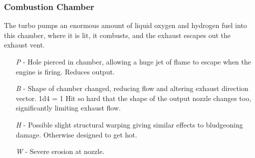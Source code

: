 \documentclass[a4paper]{article}
\begin{document}
\vspace{-0.5cm} \hspace{-18pt} \subsubsection{Combustion Chamber} \label{engine_combustion} \vspace{-0.2cm}
The turbo pumps an enormous amount of liquid oxygen and hydrogen fuel into this chamber, where it is lit, it combusts, and the exhaust escapes out the exhaust vent. 
\begin{enumerate}
\item [\textit{P}] - Hole pierced in chamber, allowing a huge jet of flame to escape when the engine is firing. Reduces output.
\item [\textit{B}] - Shape of chamber changed, reducing flow and altering exhaust direction vector. \newline \hspace*{3pt} 1d4 = 1 Hit so hard that the shape of the output nozzle changes too, significantly limiting exhaust flow. 
\item [\textit{H}] - Possible slight structural warping giving similar effects to bludgeoning damage. Otherwise designed to get hot.
\item [\textit{W}] - Severe erosion at nozzle.
\end{enumerate}
\end{document}
